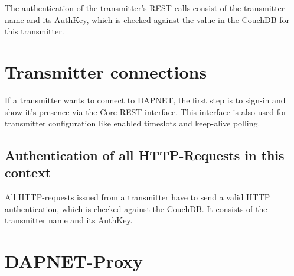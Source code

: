 The authentication of the transmitter's REST calls consist of the transmitter
name and its AuthKey, which is checked against the value in the CouchDB for this
transmitter.

\section{Transmitter connections}
If a transmitter wants to connect to DAPNET, the first step is to sign-in and
show it's presence via the Core REST interface. This interface is also used for
transmitter configuration like enabled timeslots and keep-alive polling.

\subsection{Authentication of all HTTP-Requests in this context}
All HTTP-requests issued from a transmitter have to send a valid HTTP
authentication, which is checked against the CouchDB. It consists of the
transmitter name and its AuthKey.


\section{DAPNET-Proxy}
